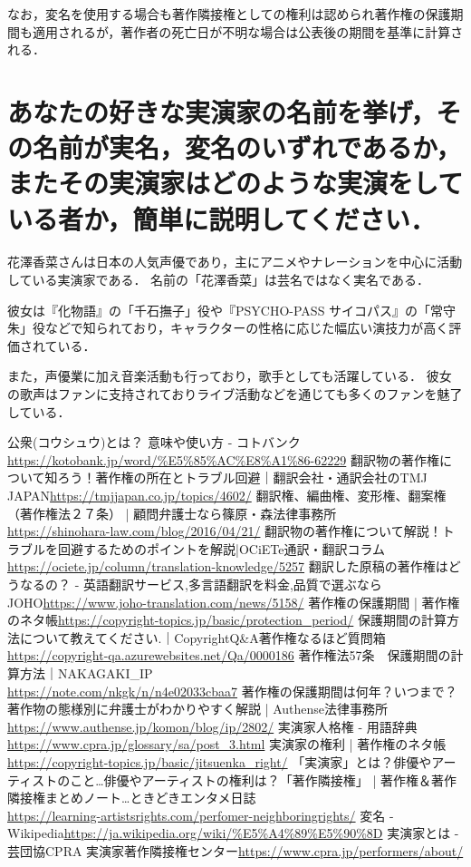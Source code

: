 \documentclass[titlepage,a4paper]{jsarticle}
\begin{document}
なお，変名を使用する場合も著作隣接権としての権利は認められ著作権の保護期間も適用されるが，著作者の死亡日が不明な場合は公表後の期間を基準に計算される\cite{q4_2}．
\section{あなたの好きな実演家の名前を挙げ，その名前が実名，変名のいずれであるか，
  またその実演家はどのような実演をしている者か，簡単に説明してください．}
花澤香菜さんは日本の人気声優であり，主にアニメやナレーションを中心に活動している実演家である．
名前の「花澤香菜」は芸名ではなく実名である．

彼女は『化物語』の「千石撫子」役や『PSYCHO-PASS サイコパス』の「常守朱」役などで知られており，キャラクターの性格に応じた幅広い演技力が高く評価されている．

また，声優業に加え音楽活動も行っており，歌手としても活躍している．
彼女の歌声はファンに支持されておりライブ活動などを通じても多くのファンを魅了している．

\newpage
\begin{thebibliography}{99}
   公衆(コウシュウ)とは？ 意味や使い方 - コトバンク\url{https://kotobank.jp/word/%E5%85%AC%E8%A1%86-62229}
   翻訳物の著作権について知ろう！著作権の所在とトラブル回避｜翻訳会社・通訳会社のTMJ JAPAN\url{https://tmjjapan.co.jp/topics/4602/}
   翻訳権、編曲権、変形権、翻案権（著作権法２７条） | 顧問弁護士なら篠原・森法律事務所
  \\\url{https://shinohara-law.com/blog/2016/04/21/}
   翻訳物の著作権について解説！トラブルを回避するためのポイントを解説|OCiETe通訳・翻訳コラム\url{https://ociete.jp/column/translation-knowledge/5257}
   翻訳した原稿の著作権はどうなるの？ - 英語翻訳サービス,多言語翻訳を料金,品質で選ぶならJOHO\url{https://www.joho-translation.com/news/5158/}
   著作権の保護期間 | 著作権のネタ帳\url{https://copyright-topics.jp/basic/protection_period/}
   保護期間の計算方法について教えてください.｜CopyrightQ\&A著作権なるほど質問箱\url{https://copyright-qa.azurewebsites.net/Qa/0000186}
   著作権法57条　保護期間の計算方法｜NAKAGAKI\_IP
  \\\url{https://note.com/nkgk/n/n4e02033cbaa7}
   著作権の保護期間は何年？いつまで？著作物の態様別に弁護士がわかりやすく解説 | Authense法律事務所\url{https://www.authense.jp/komon/blog/ip/2802/}
   実演家人格権 - 用語辞典\url{https://www.cpra.jp/glossary/sa/post_3.html}
   実演家の権利 | 著作権のネタ帳\url{https://copyright-topics.jp/basic/jitsuenka_right/}
   「実演家」とは？俳優やアーティストのこと…俳優やアーティストの権利は？「著作隣接権」 | 著作権＆著作隣接権まとめノート…ときどきエンタメ日誌
  \\\url{https://learning-artistsrights.com/perfomer-neighboringrights/}
   変名 - Wikipedia\url{https://ja.wikipedia.org/wiki/%E5%A4%89%E5%90%8D}
   実演家とは - 芸団協CPRA 実演家著作隣接権センター\url{https://www.cpra.jp/performers/about/}
\end{thebibliography}
\end{document}
